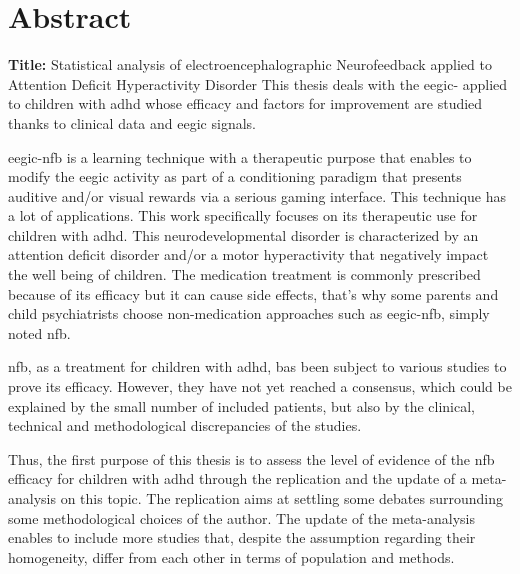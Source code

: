 


\chapter*{Abstract}

\noindent \large{\textbf{Title:}} Statistical analysis of electroencephalographic Neurofeedback applied to Attention Deficit Hyperactivity Disorder
\vskip 0.3in
This thesis deals with the \gls{eegic}- applied to children with \gls{adhd} whose efficacy and factors for 
improvement are studied thanks to clinical data and \gls{eegic} signals.

\gls{eegic}-\gls{nfb} is a learning technique with a therapeutic purpose that enables to modify the \gls{eegic} activity 
as part of a conditioning paradigm that presents auditive and/or visual rewards via a serious gaming interface.
This technique has a lot of applications. This work specifically focuses on its therapeutic use for children with \gls{adhd}.
This neurodevelopmental disorder is characterized by an attention deficit disorder and/or a motor hyperactivity that
negatively impact the well being of children. The medication treatment is commonly prescribed because of its efficacy but
it can cause side effects, that's why some parents and child psychiatrists choose non-medication approaches such as \gls{eegic}-\gls{nfb}, simply noted 
\gls{nfb}. 

\gls{nfb}, as a treatment for children with \gls{adhd}, bas been subject to various studies to prove its efficacy. 
However, they have not yet reached a consensus, which could be explained by the small number of included patients, but also by
the clinical, technical and methodological discrepancies of the studies.  

Thus, the first purpose of this thesis is to assess the level of evidence of the \gls{nfb} efficacy for children with \gls{adhd}
through the replication and the update of a meta-analysis on this topic. 
The replication aims at settling some debates surrounding some methodological choices of the author. 
The update of the meta-analysis enables to include more studies that, despite the assumption regarding their homogeneity, 
differ from each other in terms of population and methods.

